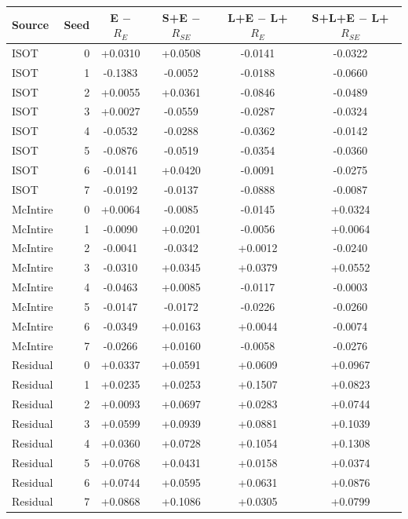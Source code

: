 \begin{tabular}{@{}lrcccc@{}}
\toprule
Source & Seed & E $-$ $R_E$ & S+E $-$ $R_{SE}$ & L+E $-$ L+$R_E$ & S+L+E $-$ L+$R_{SE}$\\
\midrule
ISOT & 0 & +0.0310 & +0.0508 & -0.0141 & -0.0322\\
ISOT & 1 & -0.1383 & -0.0052 & -0.0188 & -0.0660\\
ISOT & 2 & +0.0055 & +0.0361 & -0.0846 & -0.0489\\
ISOT & 3 & +0.0027 & -0.0559 & -0.0287 & -0.0324\\
ISOT & 4 & -0.0532 & -0.0288 & -0.0362 & -0.0142\\
ISOT & 5 & -0.0876 & -0.0519 & -0.0354 & -0.0360\\
ISOT & 6 & -0.0141 & +0.0420 & -0.0091 & -0.0275\\
ISOT & 7 & -0.0192 & -0.0137 & -0.0888 & -0.0087\\
McIntire & 0 & +0.0064 & -0.0085 & -0.0145 & +0.0324\\
McIntire & 1 & -0.0090 & +0.0201 & -0.0056 & +0.0064\\
McIntire & 2 & -0.0041 & -0.0342 & +0.0012 & -0.0240\\
McIntire & 3 & -0.0310 & +0.0345 & +0.0379 & +0.0552\\
McIntire & 4 & -0.0463 & +0.0085 & -0.0117 & -0.0003\\
McIntire & 5 & -0.0147 & -0.0172 & -0.0226 & -0.0260\\
McIntire & 6 & -0.0349 & +0.0163 & +0.0044 & -0.0074\\
McIntire & 7 & -0.0266 & +0.0160 & -0.0058 & -0.0276\\
Residual & 0 & +0.0337 & +0.0591 & +0.0609 & +0.0967\\
Residual & 1 & +0.0235 & +0.0253 & +0.1507 & +0.0823\\
Residual & 2 & +0.0093 & +0.0697 & +0.0283 & +0.0744\\
Residual & 3 & +0.0599 & +0.0939 & +0.0881 & +0.1039\\
Residual & 4 & +0.0360 & +0.0728 & +0.1054 & +0.1308\\
Residual & 5 & +0.0768 & +0.0431 & +0.0158 & +0.0374\\
Residual & 6 & +0.0744 & +0.0595 & +0.0631 & +0.0876\\
Residual & 7 & +0.0868 & +0.1086 & +0.0305 & +0.0799\\
\bottomrule
\end{tabular}
